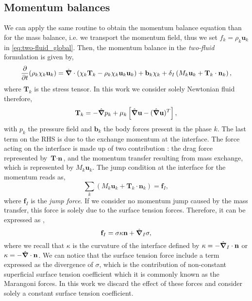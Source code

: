 \subsection{Momentum balances}

We can apply the same routine to obtain the momentum balance equation than for the mass balance, i.e. we transport the momentum field, thus we set $f_k = \rho_k \textbf{u}_k$ in \ref{eq:two-fluid_global}.
Then, the momentum balance in the \textit{two-fluid} formulation is given by,
\begin{equation}
    \frac{\partial}{\partial t} (\rho_k \chi_k \textbf{u}_k)
    = \hat{\bm{\nabla}} \cdot \left(
        \chi_k\textbf{T}_k 
        -\rho_k \chi_k \textbf{u}_k \textbf{u}_k 
    \right) 
    + \textbf{b}_k\chi_k
    +  \delta_I\left(
        M_k \textbf{u}_k
        + \textbf{T}_k \cdot \textbf{n}_k 
    \right),
    \label{eq:two-fuild_momentum}
\end{equation}
where $\textbf{T}_k$ is the stress tensor.
In this work we consider solely Newtonian fluid therefore,
\begin{equation*}
    \textbf{T}_k 
    = -\hat{\bm{\nabla}} p_k 
    + \mu_k \left[\hat{\bm{\nabla}} \textbf{u} - (\hat{\bm{\nabla}}\textbf{u})^T\right],
\end{equation*}
with $p_k$ the pressure field and $\textbf{b}_k$ the body forces present in the phase $k$.
The last term on the RHS is due to the exchange momentum at the interface.
The force acting on the interface is made up of two contribution : the drag force represented by $\textbf{T}\cdot\textbf{n}$, and the momentum transfer resulting from mass exchange, which is represented by $M_k \textbf{u}_k$.
The jump condition at the interface for the momentum reads as, 
\begin{equation*}
    \sum_k \left(
        M_k \textbf{u}_k
        + \textbf{T}_k \cdot \textbf{n}_k
    \right)
    = \textbf{f}_I,
    \label{eq:stressjump}
\end{equation*}
where $\textbf{f}_I$ is the \textit{jump force}. 
If we consider no momentum jump caused by the mass transfer, this force is solely due to the surface tension forces. 
Therefore, it can be expressed as \citep{tryggvason2011direct},  
\begin{equation}
    \textbf{f}_I    
    = \sigma \kappa \textbf{n}
    +\hat{\bm{\nabla}}_I \sigma,
    \label{eq:f_I}
\end{equation}
where we recall that $\kappa$ is the curvature of the interface defined by $\kappa = -\hat{\bm{\nabla}}_I\cdot\textbf{n}$ or $\kappa = -\hat{\bm{\nabla}}\cdot\textbf{n}$. 
We can notice that the surface tension force include a term expressed as the divergence of $\sigma$, which is the contribution of non-constant superficial surface tension coefficient which it is commonly known as the  Marangoni forces.
In this work we discard the effect of these forces and consider solely a constant surface tension coefficient.  

